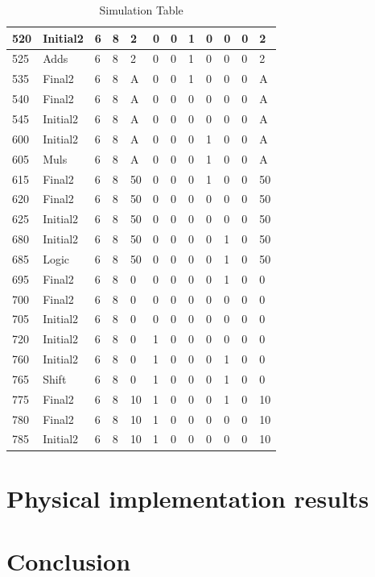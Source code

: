 \documentclass[12pt]{article}
\begin{document}
\begin{table}[H]
\begin{tabular}{|l|l|l|l|l|l|l|l|l|l|l|l|}
        \hline
        520 & Initial2 & 6 & 8&2&0&0&1&0&0&0&2\\
        \hline
        525 & Adds& 6 & 8&2&0&0&1&0&0&0&2\\
        \hline
        535 & Final2& 6 & 8&A&0&0&1&0&0&0&A\\
        \hline
        540 & Final2& 6 & 8&A&0&0&0&0&0&0&A\\
        \hline
        545 & Initial2& 6 & 8&A&0&0&0&0&0&0&A\\
        \hline
        600 & Initial2& 6 & 8&A&0&0&0&1&0&0&A\\
        \hline
        605 & Muls& 6 & 8&A&0&0&0&1&0&0&A\\
        \hline
        615 & Final2& 6 & 8&50&0&0&0&1&0&0&50\\
        \hline
        620 & Final2& 6 & 8&50&0&0&0&0&0&0&50\\
        \hline
        625 & Initial2& 6 & 8&50&0&0&0&0&0&0&50\\
        \hline
        680 & Initial2& 6 & 8&50&0&0&0&0&1&0&50\\
        \hline
        685 & Logic& 6 & 8&50&0&0&0&0&1&0&50\\
        \hline
        695 & Final2& 6 & 8&0&0&0&0&0&1&0&0\\
        \hline
        700 & Final2& 6 & 8&0&0&0&0&0&0&0&0\\
        \hline
        705 & Initial2& 6 & 8&0&0&0&0&0&0&0&0\\
        \hline
        720 & Initial2& 6 & 8&0&1&0&0&0&0&0&0\\
        \hline
        760 & Initial2& 6 & 8&0&1&0&0&0&1&0&0\\
        \hline
        765 & Shift& 6 & 8&0&1&0&0&0&1&0&0\\
        \hline
        775 & Final2& 6 & 8&10&1&0&0&0&1&0&10\\
        \hline
        780 & Final2& 6 & 8&10&1&0&0&0&0&0&10\\
        \hline
        785 & Initial2& 6 & 8&10&1&0&0&0&0&0&10\\
        \hline
        
    \end{tabular}
    \caption{Simulation Table}
    \label{tab:simulation}
     
\end{table}



\section{Physical implementation results}

\section{Conclusion}
\end{document}
